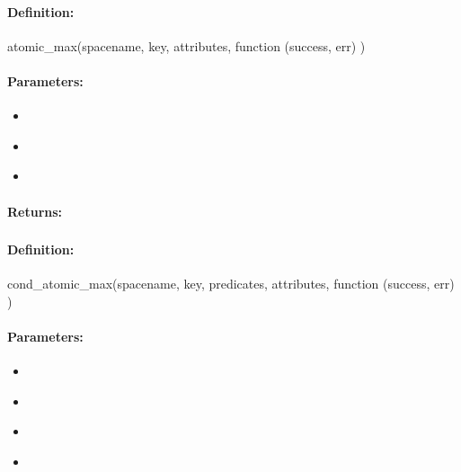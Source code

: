 \paragraph{Definition:}
\begin{javascriptcode}
atomic_max(spacename, key, attributes, function (success, err) {})
\end{javascriptcode}
\paragraph{Parameters:}
\begin{itemize}[noitemsep]
\item {}\\

\item {}\\

\item {}\\

\end{itemize}

\paragraph{Returns:}


\pagebreak
\subsubsection{}
\label{api:nodejs:cond_atomic_max}


\paragraph{Definition:}
\begin{javascriptcode}
cond_atomic_max(spacename, key, predicates, attributes, function (success, err) {})
\end{javascriptcode}
\paragraph{Parameters:}
\begin{itemize}[noitemsep]
\item {}\\

\item {}\\

\item {}\\

\item {}\\

\end{itemize}

